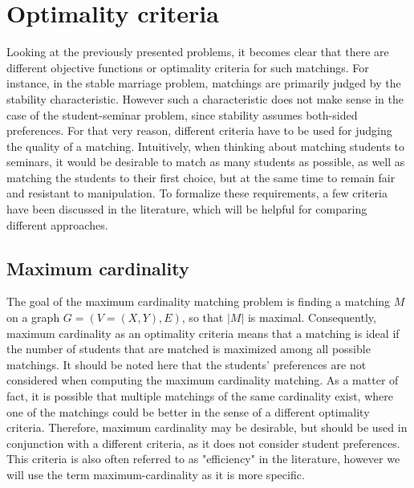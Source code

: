 \section{Optimality criteria}\label{sec:optimality}
Looking at the previously presented problems, it becomes clear that there are different objective functions or optimality criteria for such matchings. For instance, in the stable marriage problem, matchings are primarily judged by the stability characteristic. However such a characteristic does not make sense in the case of the student-seminar problem, since stability assumes both-sided preferences. For that very reason, different criteria have to be used for judging the quality of a matching.
\newline
Intuitively, when thinking about matching students to seminars, it would be desirable to match as many students as possible, as well as matching the students to their first choice, but at the same time to remain fair and resistant to manipulation. To formalize these requirements, a few criteria have been discussed in the literature, which will be helpful for comparing different approaches. 

\subsection{Maximum cardinality}
The goal of the maximum cardinality matching problem is finding a matching $M$ on a graph $G=(V=(X, Y), E)$, so that $|M|$ is maximal.\cite{GraphTheoryIntro} Consequently, maximum cardinality as an optimality criteria means that a matching is ideal if the number of students that are matched is maximized among all possible matchings. It should be noted here that the students' preferences are not considered when computing the maximum cardinality matching. As a matter of fact, it is possible that multiple matchings of the same cardinality exist, where one of the matchings could be better in the sense of a different optimality criteria. Therefore, maximum cardinality may be desirable, but should be used in conjunction with a different criteria, as it does not consider student preferences. This criteria is also often referred to as "efficiency" in the literature, however we will use the term maximum-cardinality as it is more specific.

